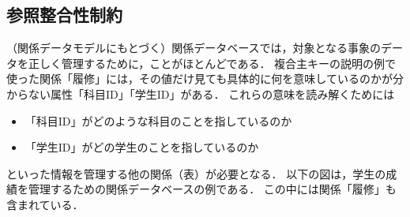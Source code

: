 

\subsection{参照整合性制約}
（関係データモデルにもとづく）関係データベースでは，対象となる事象のデータを正しく管理するために，ことがほとんどである．
複合主キーの説明の例で使った関係「履修」には，その値だけ見ても具体的に何を意味しているのかが分からない属性「科目ID」「学生ID」がある．
これらの意味を読み解くためには
\begin{itemize}
\item 「科目ID」がどのような科目のことを指しているのか
\item 「学生ID」がどの学生のことを指しているのか
\end{itemize}
といった情報を管理する他の関係（表）が必要となる．
以下の図は，学生の成績を管理するための関係データベースの例である．
この中には関係「履修」も含まれている．


